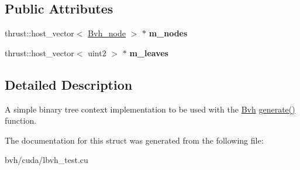 \subsection*{\-Public \-Attributes}
\begin{DoxyCompactItemize}
\item 
\hypertarget{structnih_1_1_l_b_v_h__context_a471f8ec4763729d152747997e8ae36a9}{
thrust\-::host\-\_\-vector$<$ \hyperlink{structnih_1_1_bvh__node}{\-Bvh\-\_\-node} $>$ $\ast$ {\bfseries m\-\_\-nodes}}
\label{structnih_1_1_l_b_v_h__context_a471f8ec4763729d152747997e8ae36a9}

\item 
\hypertarget{structnih_1_1_l_b_v_h__context_a80852ddca3266f1e00581c7b9ea83588}{
thrust\-::host\-\_\-vector$<$ uint2 $>$ $\ast$ {\bfseries m\-\_\-leaves}}
\label{structnih_1_1_l_b_v_h__context_a80852ddca3266f1e00581c7b9ea83588}

\end{DoxyCompactItemize}


\subsection{\-Detailed \-Description}
\-A simple binary tree context implementation to be used with the \hyperlink{structnih_1_1_bvh}{\-Bvh} \hyperlink{group__bintree_gad76a50ae08ab4d525f748a7cbcc0fb6e}{generate()} function. 

\-The documentation for this struct was generated from the following file\-:\begin{DoxyCompactItemize}
\item 
bvh/cuda/lbvh\-\_\-test.\-cu\end{DoxyCompactItemize}
